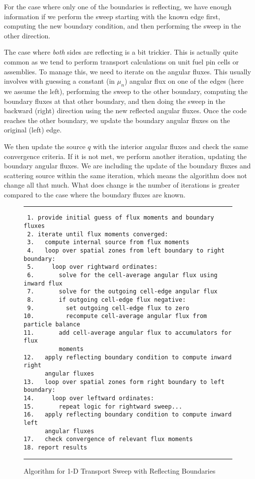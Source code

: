For the case where only one of the boundaries is reflecting, we have enough information if we perform the sweep starting with the known edge first, computing the new boundary condition, and then performing the sweep in the other direction. 

The case where \emph{both} sides are reflecting is a bit trickier. This is actually quite common as we tend to perform transport calculations on unit fuel pin cells or assemblies. To manage this, we need to iterate on the angular fluxes. This usually involves with guessing a constant (in $\mu_n$) angular flux on one of the edges (here we assume the left), performing the sweep to the other boundary, computing the boundary fluxes at that other boundary, and then doing the sweep in the backward (right) direction using the new reflected angular fluxes. Once the code reaches the other boundary, we update the boundary angular fluxes on the original (left) edge. 

We then update the source $q$ with the interior angular fluxes and check the same convergence criteria. If it is not met, we perform another iteration, updating the boundary angular fluxes. We are including the update of the boundary fluxes and scattering source within the same iteration, which means the algorithm does not change all that much. What does change is the number of iterations is greater compared to the case where the boundary fluxes are known.

\begin{figure}[tb!]
\begin{center}
\noindent \rule{\textwidth}{1pt}
\begin{verbatim}
 1. provide initial guess of flux moments and boundary fluxes 
 2. iterate until flux moments converged:
 3.   compute internal source from flux moments
 4.   loop over spatial zones from left boundary to right boundary:
 5.     loop over rightward ordinates:
 6.       solve for the cell-average angular flux using inward flux
 7.       solve for the outgoing cell-edge angular flux
 8.       if outgoing cell-edge flux negative:
 9.         set outgoing cell-edge flux to zero
10.         recompute cell-average angular flux from particle balance
11.       add cell-average angular flux to accumulators for flux 
          moments
12.   apply reflecting boundary condition to compute inward right 
      angular fluxes
13.   loop over spatial zones form right boundary to left boundary:
14.     loop over leftward ordinates:
15.       repeat logic for rightward sweep...
16.   apply reflecting boundary condition to compute inward left 
      angular fluxes  
17.   check convergence of relevant flux moments
18. report results 
\end{verbatim}
\rule{\textwidth}{1pt}
\caption{Algorithm for 1-D Transport Sweep with Reflecting Boundaries}
\label{Fig:transport_DiscreteOrdinates1DSlab_TransportSweepAlgorithm}
\end{center}
\end{figure}

